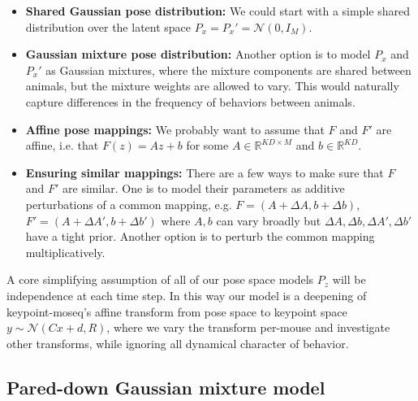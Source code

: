 \documentclass{article}         %
\newcommand{\NN}{\mathcal{N}}
\begin{document}
\begin{itemize}
    \item \textbf{Shared Gaussian pose distribution:} We could start with a simple shared distribution over the latent space $P_x = P_x' = \mathcal{N}(0, I_M)$. 
    \item  \textbf{Gaussian mixture pose distribution:} Another option is to model $P_x$ and $P_x'$ as Gaussian mixtures, where the mixture components are shared between animals, but the mixture weights are allowed to vary. This would naturally capture differences in the frequency of behaviors between animals.
    \item \textbf{Affine pose mappings:} We probably want to assume that $F$ and $F'$ are affine, i.e. that $F(z) = Az + b$ for some $A \in \mathbb{R}^{KD \times M}$ and $b \in \mathbb{R}^{KD}$. 
    \item \textbf{Ensuring similar mappings:} There are a few ways to make sure that $F$ and $F'$ are similar. One is to model their parameters as additive perturbations of a common mapping, e.g. $F = (A + \Delta A, b + \Delta b)$, $F' = (A + \Delta A', b + \Delta b')$ where $A,b$ can vary broadly but $\Delta A, \Delta b, \Delta A', \Delta b'$ have a tight prior. Another option is to perturb the common mapping multiplicatively.
\end{itemize}

A core simplifying assumption of all of our pose space models $P_z$ will be independence at each time step. In this way our model is a deepening of keypoint-moseq's affine transform from pose space to keypoint space $y \sim \NN(Cx+d, R)$, where we vary the transform per-mouse and investigate other transforms, while ignoring all dynamical character of behavior. 


\subsection{Pared-down Gaussian mixture model}
\label{sec:pared-down-gmm}
\end{document}
